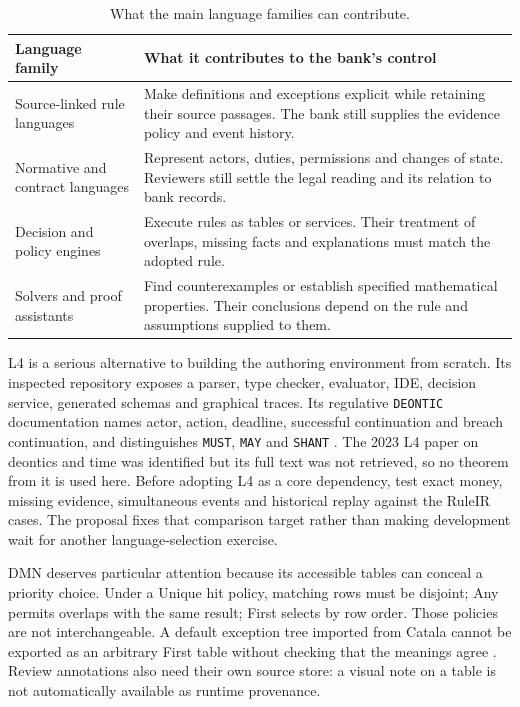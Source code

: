 \begin{table}[H]
\centering
\caption{What the main language families can contribute.}
\label{tab:software}
\begin{tabularx}{\textwidth}{P{45mm}Y}
\toprule
Language family & What it contributes to the bank's control\\
\midrule
Source-linked rule languages & Make definitions and exceptions explicit while retaining their source passages. The bank still supplies the evidence policy and event history.\\
\addlinespace[0.5em]
Normative and contract languages & Represent actors, duties, permissions and changes of state. Reviewers still settle the legal reading and its relation to bank records.\\
\addlinespace[0.5em]
Decision and policy engines & Execute rules as tables or services. Their treatment of overlaps, missing facts and explanations must match the adopted rule.\\
\addlinespace[0.5em]
Solvers and proof assistants & Find counterexamples or establish specified mathematical properties. Their conclusions depend on the rule and assumptions supplied to them.\\
\bottomrule
\end{tabularx}
\end{table}


L4 is a serious alternative to building the authoring environment from scratch.
Its inspected repository exposes a parser, type checker, evaluator, IDE,
decision service, generated schemas and graphical traces. Its regulative
\texttt{DEONTIC} documentation names actor, action, deadline, successful
continuation and breach continuation, and distinguishes \texttt{MUST},
\texttt{MAY} and \texttt{SHANT} \citep{l4code}. The 2023 L4 paper on deontics
and time was identified but its full text was not retrieved, so no theorem from
it is used here. Before adopting L4 as a core dependency, test exact money,
missing evidence, simultaneous events and historical replay against the RuleIR
cases. The proposal fixes that comparison target rather than making development
wait for another language-selection exercise.

DMN deserves particular attention because its accessible tables can conceal a
priority choice. Under a Unique hit policy, matching rows must be disjoint; Any
permits overlaps with the same result; First selects by row order. Those policies
are not interchangeable. A default exception tree imported from Catala cannot be
exported as an arbitrary First table without checking that the meanings agree
\citep[sec.~8.2.11]{dmn2024}. Review annotations also need their own source store:
a visual note on a table is not automatically available as runtime provenance.

